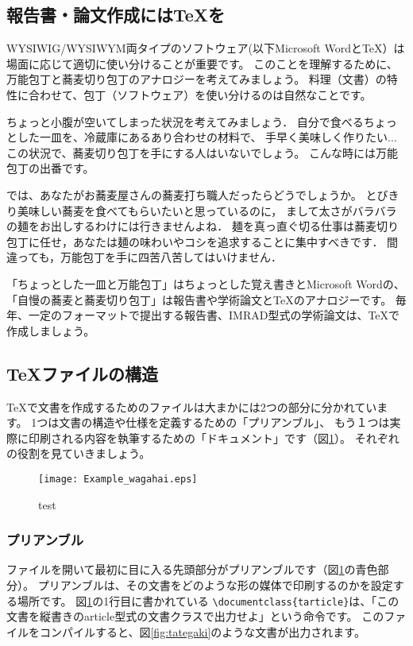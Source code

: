 \documentclass[TeXworkshop]{subfiles}
\begin{document}
\subsection{報告書・論文作成には\TeX を}
WYSIWIG/WYSIWYM両タイプのソフトウェア(以下Microsoft Wordと\TeX）は
場面に応じて適切に使い分けることが重要です。
このことを理解するために、万能包丁と蕎麦切り包丁のアナロジーを考えてみましょう。
料理（文書）の特性に合わせて、包丁（ソフトウェア）を使い分けるのは自然なことです。

ちょっと小腹が空いてしまった状況を考えてみましょう．
自分で食べるちょっとした一皿を、冷蔵庫にあるあり合わせの材料で、
手早く美味しく作りたい...
この状況で、蕎麦切り包丁を手にする人はいないでしょう。
こんな時には万能包丁の出番です。

では、あなたがお蕎麦屋さんの蕎麦打ち職人だったらどうでしょうか。
とびきり美味しい蕎麦を食べてもらいたいと思っているのに，
まして太さがバラバラの麺をお出しするわけには行きませんよね．
麺を真っ直ぐ切る仕事は蕎麦切り包丁に任せ，あなたは麺の味わいやコシを追求することに集中すべきです．
間違っても，万能包丁を手に四苦八苦してはいけません．

「ちょっとした一皿と万能包丁」はちょっとした覚え書きとMicrosoft Wordの、
「自慢の蕎麦と蕎麦切り包丁」は報告書や学術論文と\TeX のアナロジーです。
毎年、一定のフォーマットで提出する報告書、IMRAD型式の学術論文は、\TeX で作成しましょう。

\subsection{\TeX ファイルの構造}
\TeX で文書を作成するためのファイルは大まかには2つの部分に分かれています。
1つは文書の構造や仕様を定義するための「プリアンブル」、
もう１つは実際に印刷される内容を執筆するための「ドキュメント」です（図\ref{fig:example_wagahai}）。
それぞれの役割を見ていきましょう。

\begin{figure}[H]
 \begin{center}
  \texttt{[image: Example\_wagahai.eps]}
  \caption{test}\label{fig:example_wagahai}
 \end{center}
\end{figure}

\subsubsection{プリアンブル}
ファイルを開いて最初に目に入る先頭部分がプリアンブルです（図\ref{fig:example_wagahai}の青色部分）。
プリアンブルは、その文書をどのような形の媒体で印刷するのかを設定する場所です。
図\ref{fig:example_wagahai}の1行目に書かれている
\verb|\documentclass{tarticle}|は、「この文書を縦書きのarticle型式の文書クラスで出力せよ」という命令です。
このファイルをコンパイルすると、図\ref{fig:tategaki}のような文書が出力されます。
\end{document}
